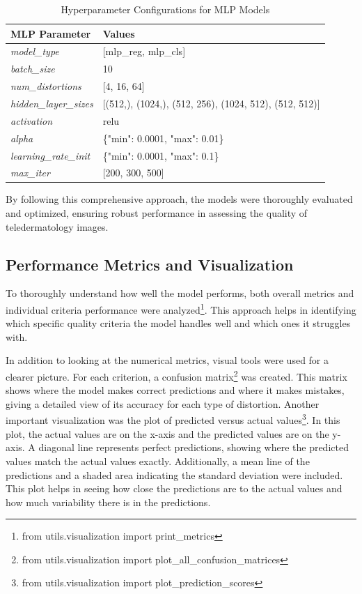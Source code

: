\begin{table}[h]
    \centering
    \begin{tabular}{|l|l|}
        \hline
        \textbf{MLP Parameter} & \textbf{Values} \\
        \hline
        \textit{model\_type} & [mlp\_reg, mlp\_cls] \\
        \textit{batch\_size} & 10 \\
        \textit{num\_distortions} & [4, 16, 64] \\
        \textit{hidden\_layer\_sizes} & [(512,), (1024,), (512, 256), (1024, 512), (512, 512)] \\
        \textit{activation} & relu \\
        \textit{alpha} & \{"min": 0.0001, "max": 0.01\} \\
        \textit{learning\_rate\_init} & \{"min": 0.0001, "max": 0.1\} \\
        \textit{max\_iter} & [200, 300, 500] \\
        \hline
    \end{tabular}
    \caption{Hyperparameter Configurations for MLP Models}
    \label{table:mlp_hyperparams}
\end{table}
\vspace{\baselineskip}
\noindent
By following this comprehensive approach, the models were thoroughly evaluated and optimized, ensuring robust performance in assessing the quality of teledermatology images. \par

\subsection{Performance Metrics and Visualization}
\label{sub:PerfMetrics}
To thoroughly understand how well the model performs, both overall metrics and individual criteria performance were analyzed\footnote{from utils.visualization import print\_metrics}. This approach helps in identifying which specific quality criteria the model handles well and which ones it struggles with. \par
\vspace{\baselineskip}
\noindent
In addition to looking at the numerical metrics, visual tools were used for a clearer picture. For each criterion, a confusion matrix\footnote{from utils.visualization import plot\_all\_confusion\_matrices} was created. This matrix shows where the model makes correct predictions and where it makes mistakes, giving a detailed view of its accuracy for each type of distortion. Another important visualization was the plot of predicted versus actual values\footnote{from utils.visualization import plot\_prediction\_scores}. In this plot, the actual values are on the x-axis and the predicted values are on the y-axis. A diagonal line represents perfect predictions, showing where the predicted values match the actual values exactly. Additionally, a mean line of the predictions and a shaded area indicating the standard deviation were included. This plot helps in seeing how close the predictions are to the actual values and how much variability there is in the predictions. \par

